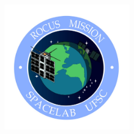 \begin{titlepage}
\begin{figure}[!ht]
    \begin{center}   \includegraphics[width=0.5\textwidth]{figures/ro-logo.png}
    \end{center}
\end{figure}

\vfill
\vfill

\begin{flushright}
    \MONTH~ \YEAR
\end{flushright}

\end{titlepage}
